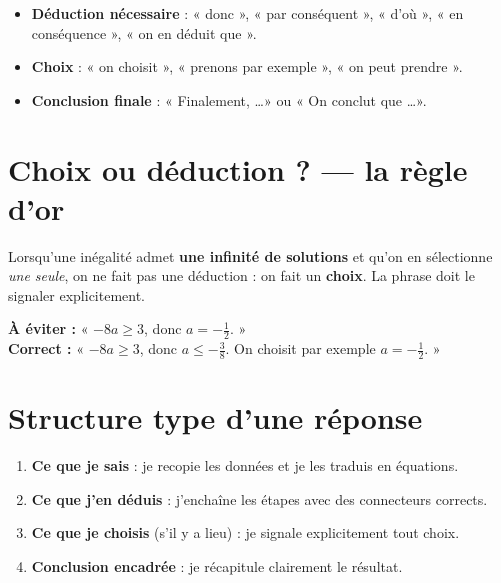 \documentclass[11pt,a4paper]{article}
\begin{document}
\begin{indice}
\begin{itemize}[leftmargin=*]
  \item \textbf{Déduction nécessaire} : « donc », « par conséquent », « d'où », « en conséquence », « on en déduit que ».
  \item \textbf{Choix} : « on choisit », « prenons par exemple », « on peut prendre ».
  \item \textbf{Conclusion finale} : « Finalement, \dots » ou « On conclut que \dots ».
\end{itemize}
\end{indice}

\section{Choix ou déduction ? — la règle d'or}

\begin{indice}[Règle d'or]
Lorsqu'une inégalité admet \textbf{une infinité de solutions} et qu'on en sélectionne \emph{une seule}, on ne fait pas une déduction : on fait un \textbf{choix}. La phrase doit le signaler explicitement.
\end{indice}

\begin{rapport}[Comparaison]
\textbf{À éviter :} « $-8a \geq 3$, donc $a = -\frac{1}{2}$. » \\
\textbf{Correct :} « $-8a \geq 3$, donc $a \leq -\frac{3}{8}$. On choisit par exemple $a = -\frac{1}{2}$. »
\end{rapport}

\section{Structure type d'une réponse}

\begin{methode}
\begin{enumerate}[leftmargin=*]
  \item \textbf{Ce que je sais} : je recopie les données et je les traduis en équations.
  \item \textbf{Ce que j'en déduis} : j'enchaîne les étapes avec des connecteurs corrects.
  \item \textbf{Ce que je choisis} (s'il y a lieu) : je signale explicitement tout choix.
  \item \textbf{Conclusion encadrée} : je récapitule clairement le résultat.
\end{enumerate}
\end{methode}
\end{document}
